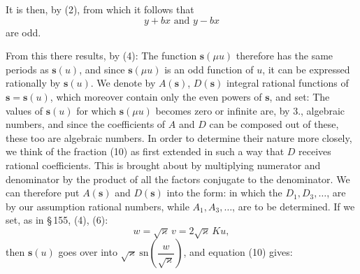
It is then, by (2),
from which it follows that
\[
y + bx \text{ and } y - bx
\]
are odd.

From this there results, by (4):
The function $\boldsymbol{s}(\mu u)$ therefore has the same periods as $\boldsymbol{s}(u)$,
and since $\boldsymbol{s}(\mu u)$ is an odd function of $u$, it can be expressed rationally by $\boldsymbol{s}(u)$. We denote by $A(\boldsymbol{s})$, $D(\boldsymbol{s})$ integral rational functions of $\boldsymbol{s} = \boldsymbol{s}(u)$, which moreover contain only the even powers of $\boldsymbol{s}$, and set:
The values of $\boldsymbol{s}(u)$ for which $\boldsymbol{s}(\mu u)$ becomes zero or infinite are, by 3., algebraic numbers, and since the coefficients of $A$ and $D$ can be composed out of these, these too are algebraic numbers. In order to determine their nature more closely, we think of the fraction (10) as first extended in such a way that $D$ receives rational coefficients. This is brought about by multiplying numerator and denominator by the product of all the factors conjugate to the denominator. We can therefore put $A(\boldsymbol{s})$ and $D(\boldsymbol{s})$ into the form:
in which the $D_1, D_3, \dots$, are by our assumption rational numbers, while $A_1, A_3, \dots$, are to be determined. If we set, as in \S\,155, (4), (6):
\[
w = \sqrt{\varkappa}\,v = 2\sqrt{\varkappa}\,Ku,
\]
then $\boldsymbol{s}(u)$ goes over into $\sqrt{\varkappa}\ \mathrm{sn}\left(\dfrac{w}{\sqrt{\varkappa}}\right)$, and equation (10) gives:
